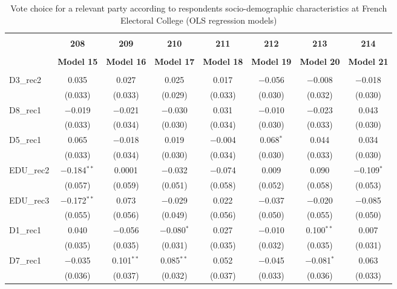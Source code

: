 \documentclass[
]{article}
\begin{document}
\begin{table}[!htbp] \centering 
  \caption{Vote choice for a relevant party according to respondents
                         socio-demographic characteristics at French Electoral College (OLS regression models)} 
  \label{table:full_ols_be_fr} 
\begin{tabular}{@{\extracolsep{0.5pt}}lccccccc} 
\\[-1.8ex]\hline \\[-1.8ex] 
 & \textbf{208} & \textbf{209} & \textbf{210} & \textbf{211} & \textbf{212} & \textbf{213} & \textbf{214} \\ 
\\[-1.8ex] & \textbf{Model 15} & \textbf{Model 16} & \textbf{Model 17} & \textbf{Model 18} & \textbf{Model 19} & \textbf{Model 20} & \textbf{Model 21}\\ 
\hline \\[-1.8ex] 
 D3\_rec2 & 0.035 & 0.027 & 0.025 & 0.017 & $-$0.056 & $-$0.008 & $-$0.018 \\ 
  & (0.033) & (0.033) & (0.029) & (0.033) & (0.030) & (0.032) & (0.030) \\ 
  D8\_rec1 & $-$0.019 & $-$0.021 & $-$0.030 & 0.031 & $-$0.010 & $-$0.023 & 0.043 \\ 
  & (0.033) & (0.034) & (0.030) & (0.034) & (0.030) & (0.033) & (0.030) \\ 
  D5\_rec1 & 0.065 & $-$0.018 & 0.019 & $-$0.004 & 0.068$^{*}$ & 0.044 & 0.034 \\ 
  & (0.033) & (0.034) & (0.030) & (0.034) & (0.030) & (0.033) & (0.030) \\ 
  EDU\_rec2 & $-$0.184$^{**}$ & 0.0001 & $-$0.032 & $-$0.074 & 0.009 & 0.090 & $-$0.109$^{*}$ \\ 
  & (0.057) & (0.059) & (0.051) & (0.058) & (0.052) & (0.058) & (0.053) \\ 
  EDU\_rec3 & $-$0.172$^{**}$ & 0.073 & $-$0.029 & 0.022 & $-$0.037 & $-$0.020 & $-$0.085 \\ 
  & (0.055) & (0.056) & (0.049) & (0.056) & (0.050) & (0.055) & (0.050) \\ 
  D1\_rec1 & 0.040 & $-$0.056 & $-$0.080$^{*}$ & 0.027 & $-$0.010 & 0.100$^{**}$ & 0.007 \\ 
  & (0.035) & (0.035) & (0.031) & (0.035) & (0.032) & (0.035) & (0.031) \\ 
  D7\_rec1 & $-$0.035 & 0.101$^{**}$ & 0.085$^{**}$ & 0.052 & $-$0.045 & $-$0.081$^{*}$ & 0.063 \\ 
  & (0.036) & (0.037) & (0.032) & (0.037) & (0.033) & (0.036) & (0.033) \\ 

\end{tabular}
\end{table}
\end{document}
